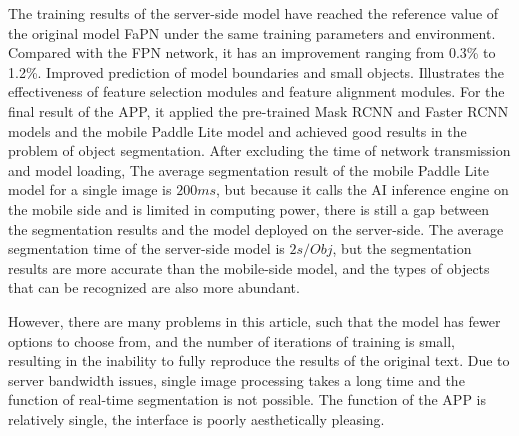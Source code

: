 The training results of the server-side model have reached the reference value of the original model FaPN under the same training parameters and environment. Compared with the FPN network, it has an improvement ranging from 0.3\% to 1.2\%. Improved prediction of model boundaries and small objects. Illustrates the effectiveness of feature selection modules and feature alignment modules. For the final result of the APP, it applied the pre-trained Mask RCNN and Faster RCNN models and the mobile Paddle Lite model and achieved good results in the problem of object segmentation. After excluding the time of network transmission and model loading, The average segmentation result of the mobile Paddle Lite model for a single image is $200ms$, but because it calls the AI inference engine on the mobile side and is limited in computing power, there is still a gap between the segmentation results and the model deployed on the server-side. The average segmentation time of the server-side model is $2s/Obj$, but the segmentation results are more accurate than the mobile-side model, and the types of objects that can be recognized are also more abundant.


However, there are many problems in this article, such that the model has fewer options to choose from, and the number of iterations of training is small, resulting in the inability to fully reproduce the results of the original text. Due to server bandwidth issues, single image processing takes a long time and the function of real-time segmentation is not possible. The function of the APP is relatively single, the interface is poorly aesthetically pleasing.